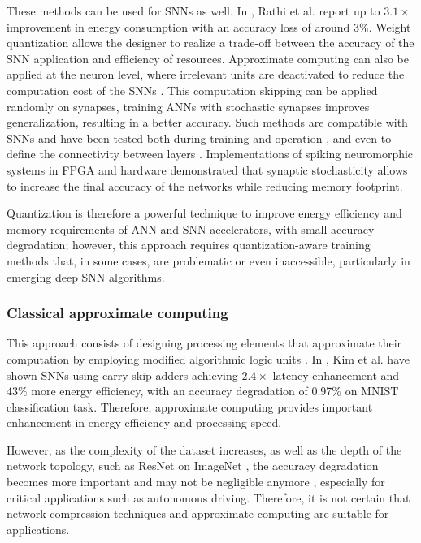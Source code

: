 These methods can be used for SNNs as well. In \cite{rathi2018stdp}, Rathi et al. report up to $3.1\times$ improvement in energy consumption with an accuracy loss of around $3\%$. Weight quantization allows the designer to realize a trade-off between the accuracy of the SNN application and efficiency of resources. Approximate computing can also be applied at the neuron level, where irrelevant units are deactivated to reduce the computation cost of the SNNs \cite{sen2017approximate}. This computation skipping can be applied randomly on synapses, training ANNs with stochastic synapses improves generalization, resulting in a better accuracy\cite{srivastava2014dropout, wan2013regularization}. Such methods are compatible with SNNs and have been tested both during training \cite{neftci2016stochastic, srinivasan2016magnetic} and operation \cite{buesing2011neural}, and even to define the connectivity between layers \cite{bellec2017deep, chen20184096}. Implementations of spiking neuromorphic systems in FPGA \cite{sheik2016synaptic} and hardware \cite{jerry2017ultra} demonstrated that synaptic stochasticity allows to increase the final accuracy of the networks while reducing memory footprint.

Quantization is therefore a powerful technique to improve energy efficiency and memory requirements of ANN and SNN accelerators, with small accuracy degradation; however, this approach requires quantization-aware training methods that, in some cases, are problematic or even inaccessible, particularly in emerging deep SNN algorithms\cite{zhang2018survey}.

\subsubsection{Classical approximate computing}
This approach consists of designing processing elements that approximate their computation by employing modified algorithmic logic units \cite{han2013approximate}. In \cite{kim2013energy}, Kim et al. have shown SNNs using carry skip adders achieving $2.4\times$ latency enhancement and $43\%$ more energy efficiency, with an accuracy degradation of 0.97\% on MNIST classification task. Therefore, approximate computing provides important enhancement in energy efficiency and processing speed.

However, as the complexity of the dataset increases, as well as the depth of the network topology, such as ResNet \cite{he2016deep} on ImageNet \cite{russakovsky2015imagenet}, the accuracy degradation becomes more important and may not be negligible anymore \cite{rastegari2016xnor}, especially for critical applications such as autonomous driving. Therefore, it is not certain that network compression techniques and approximate computing are suitable for  applications.


